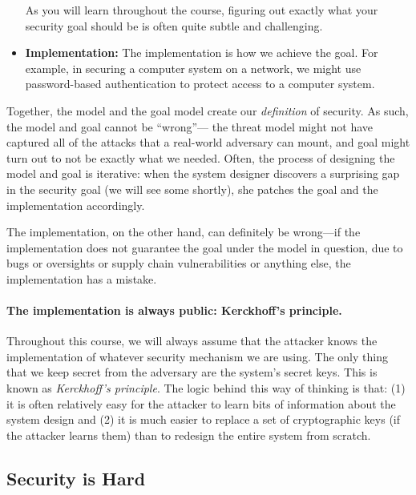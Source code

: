 \begin{itemize}
    As you will learn throughout the course, figuring out exactly what your
    security goal should be is often quite subtle and challenging.

  \item \textbf{Implementation:}
    The implementation is how we achieve the goal.
    For example, in securing a computer system on a network, we 
    might use password-based authentication to protect access to a computer system.
\end{itemize}

Together, the model and the goal model create our
\textit{definition} of security.
As such, the model and goal
cannot be ``wrong''---%
the threat model might not have captured all of
the attacks that a real-world adversary can mount,
and goal might turn out to
not be exactly what we needed.
Often, the process of designing the model and goal is iterative:
when the system designer discovers a surprising gap in the security
goal (we will see some shortly), she patches the goal and the implementation
accordingly.

The implementation, on the other hand, can definitely be wrong---if 
the implementation does not guarantee the goal
under the model in question, due to bugs or
oversights or supply chain vulnerabilities or
anything else, the implementation has a mistake.

\paragraph{The implementation is always public: Kerckhoff's principle.}
Throughout this course, we will always assume that the attacker knows
the implementation of whatever security mechanism we are using.
The only thing that we keep secret from the adversary are the system's
secret keys.
This is known as \emph{Kerckhoff's principle}.
The logic behind this way of thinking is that: (1) it is often
relatively easy for the attacker to learn bits of information 
about the system design and (2) it is much easier to replace
a set of cryptographic keys (if the attacker learns them) than
to redesign the entire system from scratch.


\subsection{Security is Hard}

